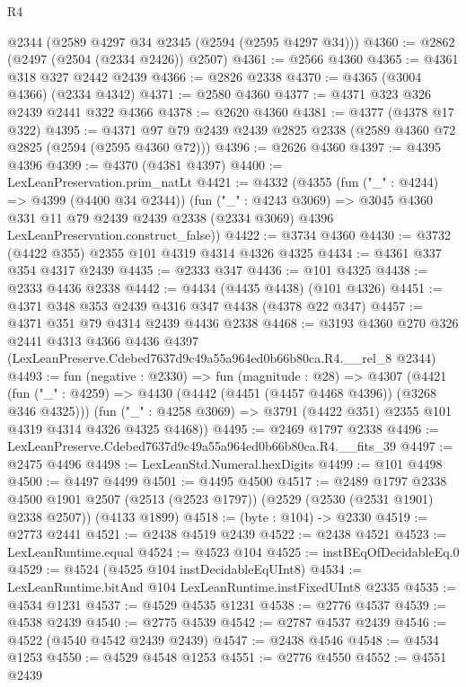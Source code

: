 \begin{lexlean}{R4}
\begin{coremodule}
    @2344
    (@2589 @4297 @34 @2345 (@2594 (@2595 @4297 @34)))
@4360 := @2862 (@2497 (@2504 (@2334 @2426)) @2507)
@4361 := @2566 @4360
@4365 := @4361 @318 @327 @2442 @2439
@4366 := @2826 @2338
@4370 := @4365 (@3004 @4366) (@2334 @4342)
@4371 := @2580 @4360
@4377 := @4371 @323 @326 @2439 @2441 @322 @4366
@4378 := @2620 @4360
@4381 := @4377 (@4378 @17 @322)
@4395 := @4371 @97 @79 @2439 @2439 @2825 @2338 (@2589 @4360 @72 @2825 (@2594 (@2595 @4360 @72)))
@4396 := @2626 @4360
@4397 := @4395 @4396
@4399 := @4370 (@4381 @4397)
@4400 := LexLeanPreservation.prim_natLt
@4421 := @4332
    (@4355
      (fun ("_" : @4244) => @4399 (@4400 @34 @2344))
      (fun ("_" : @4243 @3069) =>
      @3045
        @4360
        @331
        @11
        @79
        @2439
        @2439
        @2338
        (@2334 @3069)
        @4396
        LexLeanPreservation.construct_false))
@4422 := @3734 @4360
@4430 := @3732 (@4422 @355) @2355 @101 @4319 @4314 @4326 @4325
@4434 := @4361 @337 @354 @4317 @2439
@4435 := @2333 @347
@4436 := @101 @4325
@4438 := @2333 @4436 @2338
@4442 := @4434 (@4435 @4438) (@101 @4326)
@4451 := @4371 @348 @353 @2439 @4316 @347 @4438 (@4378 @22 @347)
@4457 := @4371 @351 @79 @4314 @2439 @4436 @2338
@4468 := @3193
    @4360
    @270
    @326
    @2441
    @4313
    @4366
    @4436
    @4397
    (LexLeanPreserve.Cdebed7637d9c49a55a964ed0b66b80ca.R4.__rel_8 @2344)
@4493 := fun (negative : @2330) =>
  fun (magnitude : @28) =>
  @4307
    (@4421
      (fun ("_" : @4259) => @4430 (@4442 (@4451 (@4457 @4468 @4396)) (@3268 @346 @4325)))
      (fun ("_" : @4258 @3069) => @3791 (@4422 @351) @2355 @101 @4319 @4314 @4326 @4325 @4468))
@4495 := @2469 @1797 @2338
@4496 := LexLeanPreserve.Cdebed7637d9c49a55a964ed0b66b80ca.R4.__fits_39
@4497 := @2475 @4496
@4498 := LexLeanStd.Numeral.hexDigits
@4499 := @101 @4498
@4500 := @4497 @4499
@4501 := @4495 @4500
@4517 := @2489
    @1797
    @2338
    @4500
    @1901
    @2507
    (@2513 (@2523 @1797))
    (@2529 (@2530 (@2531 @1901) @2338 @2507))
    (@4133 @1899)
@4518 := (byte : @104) -> @2330
@4519 := @2773 @2441
@4521 := @2438 @4519 @2439
@4522 := @2438 @4521
@4523 := LexLeanRuntime.equal
@4524 := @4523 @104
@4525 := instBEqOfDecidableEq.{0}
@4529 := @4524 (@4525 @104 instDecidableEqUInt8)
@4534 := LexLeanRuntime.bitAnd @104 LexLeanRuntime.instFixedUInt8 @2335
@4535 := @4534 @1231
@4537 := @4529 @4535 @1231
@4538 := @2776 @4537
@4539 := @4538 @2439
@4540 := @2775 @4539
@4542 := @2787 @4537 @2439
@4546 := @4522 (@4540 @4542 @2439 @2439)
@4547 := @2438 @4546
@4548 := @4534 @1253
@4550 := @4529 @4548 @1253
@4551 := @2776 @4550
@4552 := @4551 @2439

\end{coremodule}
\end{lexlean}
